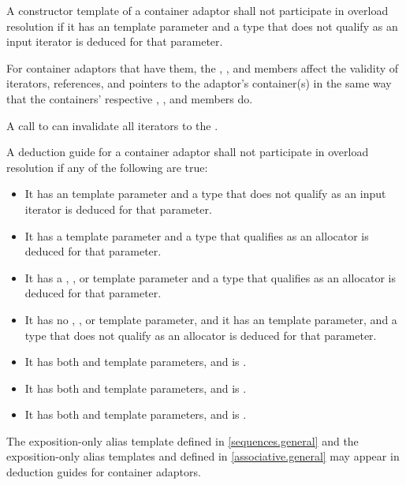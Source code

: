 \pnum
A constructor template of a container adaptor
shall not participate in overload resolution
if it has an  template parameter and
a type that does not qualify as an input iterator is deduced for that parameter.

\pnum
For container adaptors that have them,
the , , and  members
affect the validity of iterators, references, and pointers
to the adaptor's container(s) in the same way that
the containers' respective
, , and  members do.
\begin{example}
A call to 
can invalidate all iterators to the .
\end{example}

\pnum
A deduction guide for a container adaptor shall not participate in overload resolution if any of the following are true:
\begin{itemize}
\item It has an  template parameter and a type that does not qualify as an input iterator is deduced for that parameter.
\item It has a  template parameter and a type that qualifies as an allocator is deduced for that parameter.
\item It has a , , or  template parameter and a type that qualifies as an allocator is deduced for that parameter.
\item It has no , , or  template parameter, and it has an  template parameter, and a type that does not qualify as an allocator is deduced for that parameter.
\item It has both  and  template parameters, and  is .
\item It has both  and  template parameters, and
 is .
\item It has both  and  template parameters, and
 is .
\end{itemize}

\pnum
The exposition-only alias template 
defined in \ref{sequences.general} and
the exposition-only alias templates  and 
defined in \ref{associative.general}
may appear in deduction guides for container adaptors.


